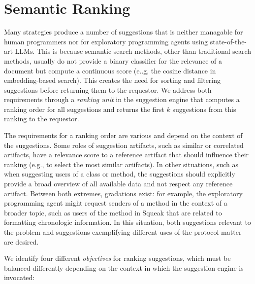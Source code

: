 
\section{Semantic Ranking}
\label{sec:suggestions/ranking}

Many strategies produce a number of suggestions that is neither managable for human programmers nor for exploratory programming agents using state-of-the-art LLMs.
This is because semantic search methods, other than traditional search methods, usually do not provide a binary classifier for the relevance of a document but compute a continuous score (e..g, the cosine distance in embedding-based search).
This creates the need for sorting and filtering suggestions before returning them to the requestor.
We address both requirements through a \emph{ranking unit} in the suggestion engine that computes a ranking order for all suggestions and returns the first $k$ suggestions from this ranking to the requestor.

The requirements for a ranking order are various and depend on the context of the suggestions.
Some roles of suggestion artifacts, such as similar or correlated artifacts, have a relevance score to a reference artifact that should influence their ranking (e.g., to select the most similar artifacts).
In other situations, such as when suggesting users of a class or method, the suggestions should explicitly provide a broad overview of all available data and not respect any reference artifact.
Between both extremes, gradations exist: for example, the exploratory programming agent might request senders of a method in the context of a broader topic, such as users of the  method in Squeak that are related to formatting chronologic information.
In this situation, both suggestions relevant to the problem and suggestions exemplifying different uses of the protocol matter are desired.

We identify four different \emph{objectives} for ranking suggestions, which must be balanced differently depending on the context in which the suggestion engine is invocated:

